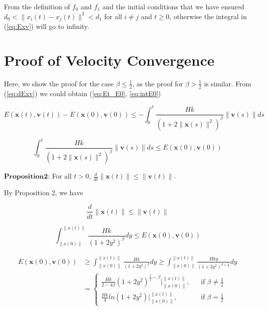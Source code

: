 \noindent
From the definition of $f_0$ and $f_1$ and the initial conditions that we have ensured $d_0<\|x_i(t)-x_j(t)\|^2<d_1$ for all $i\neq j$ and $t\geq0$, otherwise the integral in (\ref{eq:Exv}) will go to infinity.

\section{Proof of Velocity Convergence}

Here, we show the proof for the case $\beta\leq\frac{1}{2}$, as the proof for $\beta>\frac{1}{2}$ is similar. From (\ref{eq:dExv}) we could obtain (\ref{eq:Et_E0}, \ref{eq:intE0})

\begin{equation}\label{eq:Et_E0}
E(\mathbf{x}(t), \mathbf{v}(t))-E(\mathbf{x}(0), \mathbf{v}(0))\leq-\int_0^t\frac{Hk}{(1+2\|\mathbf{x}(s)\|^2)^{\beta}}\|\mathbf{v}(s)\|ds
\end{equation}

\begin{equation}\label{eq:intE0}
\int_0^t\frac{Hk}{(1+2\|\mathbf{x}(s)\|^2)^{\beta}}\|\mathbf{v}(s)\|ds\leq E(\mathbf{x}(0), \mathbf{v}(0))
\end{equation}

$\mathbf{Proposition 2}$: For all $t>0$, $\frac{d}{dt}\|\mathbf{x}(t)\|\leq\|\mathbf{v}(t)\|$.

By Proposition 2, we have

\begin{equation}\label{eq:proposition2}
\frac{d}{dt}\|\mathbf{x}(t)\|\leq\|\mathbf{v}(t)\|
\end{equation}

\begin{equation}
\int_{\|x(0)\|}^{\|x(t)\|}\frac{Hk}{(1+2y^2)^{\beta}}dy\leq E(\mathbf{x}(0), \mathbf{v}(0))
\end{equation}

\begin{equation}
\begin{aligned}
E(\mathbf{x}(0), \mathbf{v}(0))&\geq\int_{\|x(0)\|}^{\|x(t)\|}\frac{Hk}{(1+2y^2)^{\beta}}dy\geq\int_{\|x(0)\|}^{\|x(t)\|}\frac{Hky}{(1+2y^2)^{\beta+\frac{1}{2}}}dy\\
&=\left\{\begin{array}{rcl}\frac{Hk}{2-4\beta}(1+2y^2)^{\frac{1}{2}-\beta}|^{\|x(t)\|}_{\|x(0)\|}, & & \text{if $\beta\neq\frac{1}{2}$}\\\frac{Hk}{4}ln(1+2y^2)|^{\|x(t)\|}_{\|x(0)\|}, & & \text{if $\beta=\frac{1}{2}$}\end{array} \right.
\end{aligned}
\end{equation}

